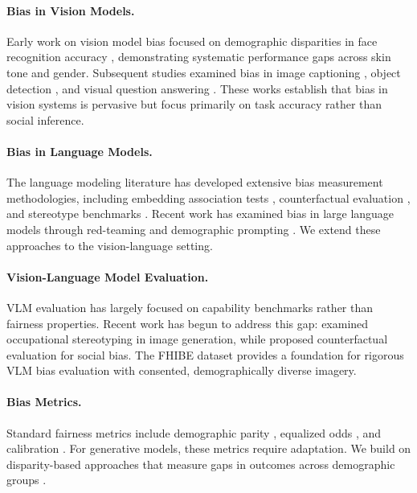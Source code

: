 \documentclass{article}
\begin{document}
\paragraph{Bias in Vision Models.}
Early work on vision model bias focused on demographic disparities in face recognition accuracy \cite{buolamwini2018gender}, demonstrating systematic performance gaps across skin tone and gender. Subsequent studies examined bias in image captioning \cite{hendricks2018women, zhao2017men}, object detection \cite{wilson2019predictive}, and visual question answering \cite{agarwal2021evaluating}. These works establish that bias in vision systems is pervasive but focus primarily on task accuracy rather than social inference.

\paragraph{Bias in Language Models.}
The language modeling literature has developed extensive bias measurement methodologies, including embedding association tests \cite{caliskan2017semantics}, counterfactual evaluation \cite{zhao2018gender}, and stereotype benchmarks \cite{nadeem2020stereoset, nangia2020crows}. Recent work has examined bias in large language models through red-teaming \cite{perez2022red} and demographic prompting \cite{deshpande2023toxicity}. We extend these approaches to the vision-language setting.

\paragraph{Vision-Language Model Evaluation.}
VLM evaluation has largely focused on capability benchmarks \cite{yue2024mmmu, fu2023mme} rather than fairness properties. Recent work has begun to address this gap: \citet{fraser2024examining} examined occupational stereotyping in image generation, while \citet{howard2024socialcounterfactuals} proposed counterfactual evaluation for social bias. The FHIBE dataset \cite{fhibe2025} provides a foundation for rigorous VLM bias evaluation with consented, demographically diverse imagery.

\paragraph{Bias Metrics.}
Standard fairness metrics include demographic parity \cite{dwork2012fairness}, equalized odds \cite{hardt2016equality}, and calibration \cite{chouldechova2017fair}. For generative models, these metrics require adaptation. We build on disparity-based approaches that measure gaps in outcomes across demographic groups \cite{mehrabi2021survey}.
\end{document}
